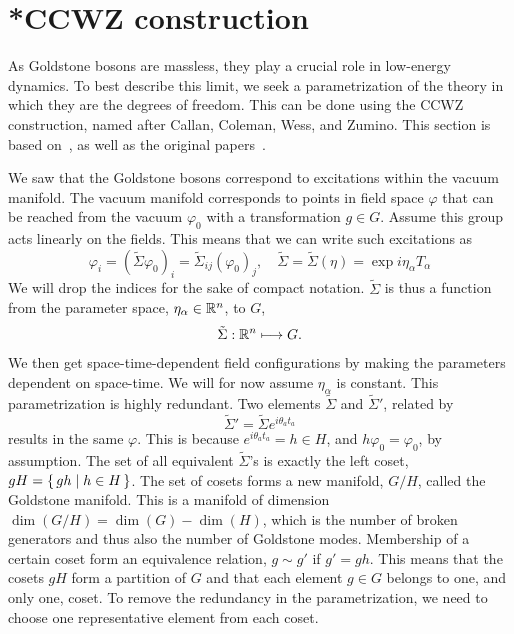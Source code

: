 \section{*CCWZ construction}
\label{seciton:ccwz construction}

As Goldstone bosons are massless, they play a crucial role in low-energy dynamics.
To best describe this limit, we seek a parametrization of the theory in which they are the degrees of freedom.
This can be done using the CCWZ construction, named after Callan, Coleman, Wess, and Zumino.
This section is based on~\autocite{morrisonColemanCallanWessZuminoConstruction2017,panicoCompositeNambuGoldstoneHiggs2016,weinbergQuantumTheoryFields1996,pichEffectiveFieldTheory2020}, as well as the original papers~\autocite{callanStructurePhenomenologicalLagrangians1969,colemanStructurePhenomenologicalLagrangians1969}.


We saw that the Goldstone bosons correspond to excitations within the vacuum manifold.
The vacuum manifold corresponds to points in field space $\varphi$ that can be reached from the vacuum $\varphi_0$ with a transformation $g \in G$.
Assume this group acts linearly on the fields.
This means that we can write such excitations as
\begin{equation}
    \varphi_i = (\tilde\Sigma \varphi_0)_{i} = \tilde \Sigma_{ij} (\varphi_0)_j, 
    \quad \tilde \Sigma = \tilde \Sigma(\eta) = \exp{i \eta_\alpha T_\alpha}
\end{equation}
%
We will drop the indices for the sake of compact notation.
$\tilde \Sigma$ is thus a function from the parameter space, $\eta_\alpha \in \mathbb{R}^n$, to $G$,
\begin{align}
    \tilde \Sigma: \mathbb{R}^n \longmapsto G.
\end{align}
%
We then get space-time-dependent field configurations by making the parameters dependent on space-time.
We will for now assume $\eta_\alpha$ is constant.
This parametrization is highly redundant.
Two elements $\tilde\Sigma$ and $\tilde\Sigma'$, related by
\begin{equation}
    \tilde \Sigma' = \tilde\Sigma e^{i \theta_a t_a}
\end{equation}
%
results in the same $\varphi$.
This is because  $e^{i \theta_a t_a} = h \in H$, and $h \varphi_0 = \varphi_0$, by assumption.
The set of all equivalent $\tilde \Sigma$'s is exactly the left coset, $gH = \left\{\, gh \mid  h \in H \,\right\}$.
The set of cosets forms a new manifold, $G / H$, called the Goldstone manifold.
This is a manifold of dimension $\dim(G/H) = \dim(G) - \dim(H)$, which is the number of broken generators and thus also the number of Goldstone modes.
Membership of a certain coset form an equivalence relation, $g \sim g'$ if $g' = gh$.
This means that the cosets $gH$ form a partition of $G$ and that each element $g \in G$ belongs to one, and only one, coset.
To remove the redundancy in the parametrization, we need to choose one representative element from each coset.

